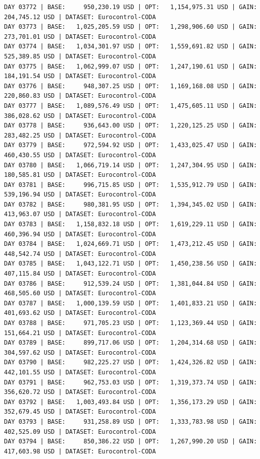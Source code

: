 \documentclass[11pt,a4paper]{article}
\begin{document}
\begin{verbatim}
DAY 03772 | BASE:     950,230.19 USD | OPT:   1,154,975.31 USD | GAIN: 204,745.12 USD | DATASET: Eurocontrol-CODA
DAY 03773 | BASE:   1,025,205.59 USD | OPT:   1,298,906.60 USD | GAIN: 273,701.01 USD | DATASET: Eurocontrol-CODA
DAY 03774 | BASE:   1,034,301.97 USD | OPT:   1,559,691.82 USD | GAIN: 525,389.85 USD | DATASET: Eurocontrol-CODA
DAY 03775 | BASE:   1,062,999.07 USD | OPT:   1,247,190.61 USD | GAIN: 184,191.54 USD | DATASET: Eurocontrol-CODA
DAY 03776 | BASE:     948,307.25 USD | OPT:   1,169,168.08 USD | GAIN: 220,860.83 USD | DATASET: Eurocontrol-CODA
DAY 03777 | BASE:   1,089,576.49 USD | OPT:   1,475,605.11 USD | GAIN: 386,028.62 USD | DATASET: Eurocontrol-CODA
DAY 03778 | BASE:     936,643.00 USD | OPT:   1,220,125.25 USD | GAIN: 283,482.25 USD | DATASET: Eurocontrol-CODA
DAY 03779 | BASE:     972,594.92 USD | OPT:   1,433,025.47 USD | GAIN: 460,430.55 USD | DATASET: Eurocontrol-CODA
DAY 03780 | BASE:   1,066,719.14 USD | OPT:   1,247,304.95 USD | GAIN: 180,585.81 USD | DATASET: Eurocontrol-CODA
DAY 03781 | BASE:     996,715.85 USD | OPT:   1,535,912.79 USD | GAIN: 539,196.94 USD | DATASET: Eurocontrol-CODA
DAY 03782 | BASE:     980,381.95 USD | OPT:   1,394,345.02 USD | GAIN: 413,963.07 USD | DATASET: Eurocontrol-CODA
DAY 03783 | BASE:   1,158,832.18 USD | OPT:   1,619,229.11 USD | GAIN: 460,396.94 USD | DATASET: Eurocontrol-CODA
DAY 03784 | BASE:   1,024,669.71 USD | OPT:   1,473,212.45 USD | GAIN: 448,542.74 USD | DATASET: Eurocontrol-CODA
DAY 03785 | BASE:   1,043,122.71 USD | OPT:   1,450,238.56 USD | GAIN: 407,115.84 USD | DATASET: Eurocontrol-CODA
DAY 03786 | BASE:     912,539.24 USD | OPT:   1,381,044.84 USD | GAIN: 468,505.60 USD | DATASET: Eurocontrol-CODA
DAY 03787 | BASE:   1,000,139.59 USD | OPT:   1,401,833.21 USD | GAIN: 401,693.62 USD | DATASET: Eurocontrol-CODA
DAY 03788 | BASE:     971,705.23 USD | OPT:   1,123,369.44 USD | GAIN: 151,664.21 USD | DATASET: Eurocontrol-CODA
DAY 03789 | BASE:     899,717.06 USD | OPT:   1,204,314.68 USD | GAIN: 304,597.62 USD | DATASET: Eurocontrol-CODA
DAY 03790 | BASE:     982,225.27 USD | OPT:   1,424,326.82 USD | GAIN: 442,101.55 USD | DATASET: Eurocontrol-CODA
DAY 03791 | BASE:     962,753.03 USD | OPT:   1,319,373.74 USD | GAIN: 356,620.72 USD | DATASET: Eurocontrol-CODA
DAY 03792 | BASE:   1,003,493.84 USD | OPT:   1,356,173.29 USD | GAIN: 352,679.45 USD | DATASET: Eurocontrol-CODA
DAY 03793 | BASE:     931,258.89 USD | OPT:   1,333,783.98 USD | GAIN: 402,525.09 USD | DATASET: Eurocontrol-CODA
DAY 03794 | BASE:     850,386.22 USD | OPT:   1,267,990.20 USD | GAIN: 417,603.98 USD | DATASET: Eurocontrol-CODA

\end{verbatim}
\end{document}
